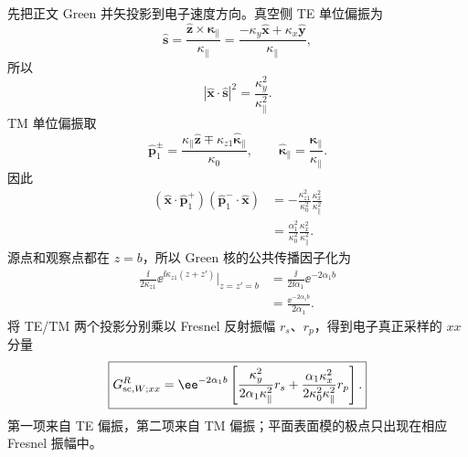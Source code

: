 \begin{exbox}
先把正文 Green 并矢投影到电子速度方向。真空侧 TE 单位偏振为
\begin{equation*}
\hat{\mathbf s}
=\frac{\hat{\mathbf z}\times\boldsymbol\kappa_\parallel}{\kappa_\parallel}
=\frac{-\kappa_y\hat{\mathbf x}+\kappa_x\hat{\mathbf y}}{\kappa_\parallel},
\end{equation*}
所以
\begin{equation*}
|\hat{\mathbf x}\cdot\hat{\mathbf s}|^2
=\frac{\kappa_y^2}{\kappa_\parallel^2}.
\end{equation*}
TM 单位偏振取
\begin{equation*}
\hat{\mathbf p}_1^\pm
=\frac{\kappa_\parallel\hat{\mathbf z}
\mp\kappa_{z1}\hat{\boldsymbol\kappa}_\parallel}{\kappa_0},
\qquad
\hat{\boldsymbol\kappa}_\parallel
=\frac{\boldsymbol\kappa_\parallel}{\kappa_\parallel}.
\end{equation*}
因此
\begin{align*}
(\hat{\mathbf x}\cdot\hat{\mathbf p}_1^+)
(\hat{\mathbf p}_1^-\cdot\hat{\mathbf x})
&=-\frac{\kappa_{z1}^2}{\kappa_0^2}
\frac{\kappa_x^2}{\kappa_\parallel^2}\\
&=\frac{\alpha_1^2}{\kappa_0^2}
\frac{\kappa_x^2}{\kappa_\parallel^2}.
\end{align*}
源点和观察点都在 $z=b$，所以 Green 核的公共传播因子化为
\begin{align*}
\frac{\ii}{2\kappa_{z1}}
\ee^{\ii\kappa_{z1}(z+z')}
\bigg|_{z=z'=b}
&=\frac{\ii}{2\ii\alpha_1}\ee^{-2\alpha_1b}\\
&=\frac{\ee^{-2\alpha_1b}}{2\alpha_1}.
\end{align*}
将 TE/TM 两个投影分别乘以 Fresnel 反射振幅 $r_s$、$r_p$，得到电子真正采样的 $xx$ 分量
\begin{equation}
\boxed{
G_{{\rm sc},W;xx}^R
=\ee^{-2\alpha_1 b}
\left[
\frac{\kappa_y^2}{2\alpha_1\kappa_\parallel^2}r_s
+\frac{\alpha_1\kappa_x^2}{2\kappa_0^2\kappa_\parallel^2}r_p
\right].}
\label{eq:planar_aloof_gxx_explicit}
\end{equation}
第一项来自 TE 偏振，第二项来自 TM 偏振；平面表面模的极点只出现在相应 Fresnel 振幅中。


\end{exbox}
